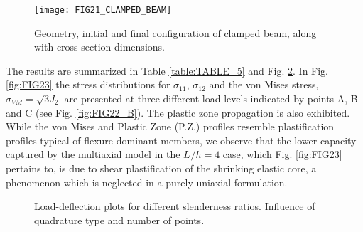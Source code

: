 \begin{figure}[t]
	\centering
	\texttt{[image: FIG21\_CLAMPED\_BEAM]}
	\caption{Geometry, initial and final configuration of clamped beam, along 
		with cross-section dimensions.}
	\label{fig:FIG21_CLAMPED_BEAM}
\end{figure}

The results are summarized in Table 
\ref{table:TABLE_5} and Fig. \ref{fig:FIG22_EQUILIBRIUM_PATHS}. In Fig. 
\ref{fig:FIG23} the stress distributions for $\sigma_{11}$, $\sigma_{12}$ and 
the von Mises stress, $\sigma_{VM}=\sqrt{3J_2}$ are presented at three 
different load levels indicated by points A, B and C (see Fig. 
\ref{fig:FIG22_B}). 
The plastic zone propagation is also exhibited. While the von Mises and Plastic 
Zone (P.Z.)
profiles resemble plastification profiles typical of flexure-dominant members, 
we observe that the lower 
capacity captured by the multiaxial model in the $L^{}/h=4$ case, which Fig. 
\ref{fig:FIG23} pertains to, is due to shear plastification of the shrinking 
elastic core, a phenomenon which is neglected in a purely uniaxial formulation.

\begin{figure}
	\centering
	\caption{Load-deflection plots for different slenderness ratios. Influence 
		of quadrature type and number of points.}
	\label{fig:FIG22_EQUILIBRIUM_PATHS}
\end{figure} 

\clearpage

\noindent{}

